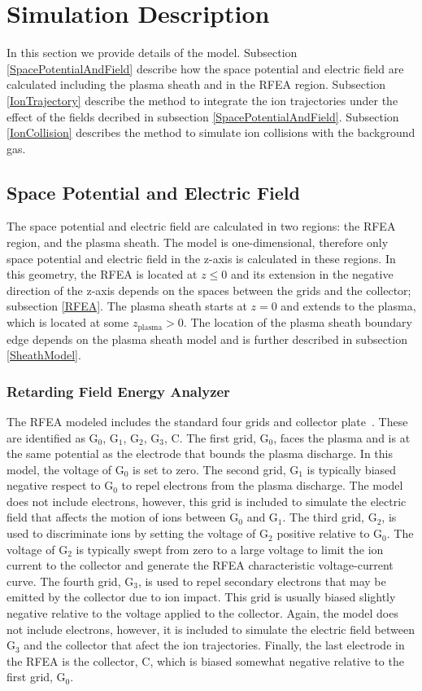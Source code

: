 \section{\label{Simulation}Simulation Description}
In this section we provide details of the model. Subsection \ref{SpacePotentialAndField} describe how the space potential and electric field are calculated including the plasma sheath and in the RFEA region. Subsection \ref{IonTrajectory} describe the method to integrate the ion trajectories under the effect of the fields decribed in subsection \ref{SpacePotentialAndField}. Subsection \ref{IonCollision} describes the method to simulate ion collisions with the background gas.

\subsection{\label{SpacePotentialAndField}Space Potential and Electric Field}
The space potential and electric field are calculated in two regions: the RFEA region, and the plasma sheath. The model is one-dimensional, therefore only space potential and electric field in the z-axis is calculated in these regions. In this geometry, the RFEA is located at $z \leq 0$ and its extension in the negative direction of the z-axis depends on the spaces between the grids and the collector; subsection \ref{RFEA}. The plasma sheath starts at $z=0$ and extends to the plasma, which is located at some $z_\text{plasma} > 0$. The location of the plasma sheath boundary edge depends on the plasma sheath model and is further described in subsection \ref{SheathModel}.   

\subsubsection{\label{RFEA}Retarding Field Energy Analyzer}
The RFEA modeled includes the standard four grids and collector plate~\cite{Hutchinson1987}. These are identified as G$_0$, G$_1$, G$_2$, G$_3$, C. The first grid, G$_0$, faces the plasma and is at the same potential as the electrode that bounds the plasma discharge. In this model, the voltage of G$_0$ is set to zero. The second grid, G$_1$ is typically biased negative respect to G$_0$ to repel electrons from the plasma discharge. The model does not include electrons, however, this grid is included to simulate the electric field that affects the motion of ions between G$_0$ and G$_1$. The third grid, G$_2$, is used to discriminate ions by setting the voltage of G$_2$ positive relative to G$_0$. The voltage of G$_2$ is typically swept from zero to a large voltage to limit the ion current to the collector and generate the RFEA characteristic voltage-current curve. The fourth grid, G$_3$, is used to repel secondary electrons that may be emitted by the collector due to ion impact. This grid is usually biased slightly negative relative to the voltage applied to the collector. Again, the model does not include electrons, however, it is included to simulate the electric field between G$_3$ and the collector that afect the ion trajectories. Finally, the last electrode in the RFEA is the collector, C, which is biased somewhat negative relative to the first grid, G$_0$.


